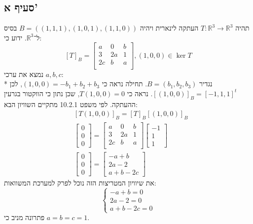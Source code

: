 \documentclass[a4paper,10pt]{article}
\begin{document}
\begin{hebrew}
	\subsection{סעיף א'}
	תהיה $T: \mathbb{R}^3 \to \mathbb{R}^3$ העתקה לינארית
	ויהיה $B = ((1, 1, 1), (1, 0, 1), (1, 1, 0))$ בסיס ל־$\mathbb{R}^3$.
	ידוע כי:
	\[
		{[T]}_B =
		\begin{bmatrix}
			a & 0 & b \\
			3 & 2a & 1 \\
			2c & b & a \\
		\end{bmatrix},
		(1, 0, 0) \in \ker T
	\]
	נמצא את ערכי $a, b, c$: \\*
	נגדיר $B = (b_1, b_2, b_3)$.
	תחילה נראה כי $(1, 0, 0) = -b_1 + b_2 + b_3$,
	לכן ${[ (1, 0, 0) ]}_B = {[-1, 1, 1]}^t$.
	נראה כי $T(1, 0, 0) = 0$, שכן נתון כי הווקטור בגרעין ההעתקה.
	לפי משפט 10.2.1 מתקיים השוויון הבא:
	\[
		\begin{aligned}
			& {[T(1, 0, 0)]}_B = {[T]}_B {[(1, 0, 0)]}_B \\
			& \begin{bmatrix} 0 \\ 0 \\ 0 \end{bmatrix} =
				\begin{bmatrix}
					a & 0 & b \\
					3 & 2a & 1 \\
					2c & b & a \\
				\end{bmatrix}
				\begin{bmatrix} -1 \\ 1 \\ 1 \end{bmatrix} \\
			& \begin{bmatrix} 0 \\ 0 \\ 0 \end{bmatrix} =
			\begin{bmatrix}
					-a + b \\
					2a - 2 \\
					a + b - 2c
				\end{bmatrix}
		\end{aligned}
	\]
	את שיוויון המטריצות הזה נוכל לפרק למערכת המשוואות:
	\[
		\begin{cases}
			-a + b = 0 \\
			2a - 2 = 0 \\
			a + b - 2c = 0
		\end{cases}
	\]
	פתרונה מניב כי $a = b = c = 1$.


\end{hebrew}
\end{document}
